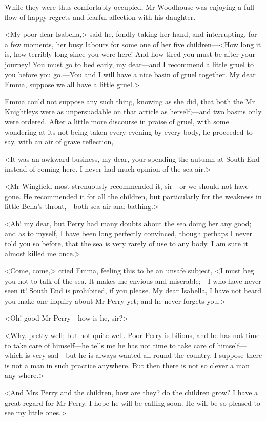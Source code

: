 While they were thus comfortably occupied, Mr Woodhouse was enjoying a full flow of happy regrets and fearful affection with his daughter.

<My poor dear Isabella,> said he, fondly taking her hand, and interrupting, for a few moments, her busy labours for some one of her five children—<How long it is, how terribly long since you were here! And how tired you must be after your journey! You must go to bed early, my dear—and I recommend a little gruel to you before you go.—You and I will have a nice basin of gruel together. My dear Emma, suppose we all have a little gruel.>

Emma could not suppose any such thing, knowing as she did, that both the Mr Knightleys were as unpersuadable on that article as herself;—and two basins only were ordered. After a little more discourse in praise of gruel, with some wondering at its not being taken every evening by every body, he proceeded to say, with an air of grave reflection,

<It was an awkward business, my dear, your spending the autumn at South End instead of coming here. I never had much opinion of the sea air.>

<Mr Wingfield most strenuously recommended it, sir—or we should not have gone. He recommended it for all the children, but particularly for the weakness in little Bella's throat,—both sea air and bathing.>

<Ah! my dear, but Perry had many doubts about the sea doing her any good; and as to myself, I have been long perfectly convinced, though perhaps I never told you so before, that the sea is very rarely of use to any body. I am sure it almost killed me once.>

<Come, come,> cried Emma, feeling this to be an unsafe subject, <I must beg you not to talk of the sea. It makes me envious and miserable;—I who have never seen it! South End is prohibited, if you please. My dear Isabella, I have not heard you make one inquiry about Mr Perry yet; and he never forgets you.>

<Oh! good Mr Perry—how is he, sir?>

<Why, pretty well; but not quite well. Poor Perry is bilious, and he has not time to take care of himself—he tells me he has not time to take care of himself—which is very sad—but he is always wanted all round the country. I suppose there is not a man in such practice anywhere. But then there is not so clever a man any where.>

<And Mrs Perry and the children, how are they? do the children grow? I have a great regard for Mr Perry. I hope he will be calling soon. He will be so pleased to see my little ones.>

